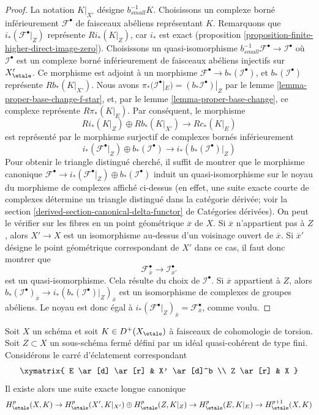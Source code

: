 \begin{proof}
La notation $K|_{X'}$ désigne $b_{small}^{-1}K$.
Choisissons un complexe borné inférieurement $\mathcal{F}^\bullet$
de faisceaux abéliens représentant $K$. Remarquons que
$i_*(\mathcal{F}^\bullet|_Z)$ représente $Ri_*(K|_Z)$,
car $i_*$ est exact
(proposition \ref{proposition-finite-higher-direct-image-zero}).
Choisissons un quasi-isomorphisme
$b_{small}^{-1}\mathcal{F}^\bullet \to \mathcal{I}^\bullet$
où $\mathcal{I}^\bullet$ est un complexe borné inférieurement de faisceaux
abéliens injectifs sur $X'_\etale$. Ce morphisme est adjoint à un morphisme
$\mathcal{F}^\bullet \to b_*(\mathcal{I}^\bullet)$, et
$b_*(\mathcal{I}^\bullet)$ représente $Rb_*(K|_{X'})$.
Nous avons $\pi_*(\mathcal{I}^\bullet|_E) = (b_*\mathcal{I}^\bullet)|_Z$
par le lemme \ref{lemma-proper-base-change-f-star}, et, par le
lemme \ref{lemma-proper-base-change}, ce complexe représente
$R\pi_*(K|_E)$. Par conséquent, le morphisme
$$
Ri_*(K|_Z) \oplus Rb_*(K|_{X'}) \to Rc_*(K|_E)
$$
est représenté par le morphisme surjectif de complexes bornés inférieurement
$$
i_*(\mathcal{F}^\bullet|_Z) \oplus
b_*(\mathcal{I}^\bullet)
\to
i_*\left(b_*(\mathcal{I}^\bullet)|_Z\right)
$$
Pour obtenir le triangle distingué cherché, il suffit de montrer que
le morphisme canonique
$\mathcal{F}^\bullet \to i_*(\mathcal{F}^\bullet|_Z) \oplus
b_*(\mathcal{I}^\bullet)$
induit un quasi-isomorphisme sur le noyau du morphisme de complexes
affiché ci-dessus (en effet, une suite exacte courte
de complexes détermine un triangle distingué dans la catégorie
dérivée; voir la
section \ref{derived-section-canonical-delta-functor} de Catégories dérivées).
On peut le vérifier sur les fibres en un point géométrique $\overline{x}$ de $X$.
Si $\overline{x}$ n'appartient pas à $Z$, alors $X' \to X$ est un isomorphisme
au-dessus d'un voisinage ouvert de $\overline{x}$. Si $\overline{x}'$
désigne le point géométrique correspondant de $X'$ dans ce cas, il
faut donc montrer que
$$
\mathcal{F}^\bullet_{\overline{x}} \to \mathcal{I}^\bullet_{\overline{x}'}
$$
est un quasi-isomorphisme. Cela résulte du choix de $\mathcal{I}^\bullet$.
Si $\overline{x}$ appartient à $Z$, alors
$b_*(\mathcal{I}^\bullet)_{\overline{x}} \to 
i_*\left(b_*(\mathcal{I}^\bullet)|_Z\right)_{\overline{x}}$
est un isomorphisme de complexes de groupes abéliens. Le
noyau est donc égal à
$i_*(\mathcal{F}^\bullet|_Z)_{\overline{x}} =
\mathcal{F}^\bullet_{\overline{x}}$, comme voulu.
\end{proof}

\begin{lemma}
\label{lemma-blow-up-square-etale-cohomology}
Soit $X$ un schéma et soit $K \in D^+(X_\etale)$ à
faisceaux de cohomologie de torsion. Soit $Z \subset X$ un sous-schéma fermé
défini par un idéal quasi-cohérent de type fini. Considérons le
carré d'éclatement correspondant
$$
\xymatrix{
E \ar[d] \ar[r] & X' \ar[d]^b \\
Z \ar[r] & X
}
$$
Il existe alors une suite exacte longue canonique
$$
H^p_\etale(X, K) \to
H^p_\etale(X', K|_{X'}) \oplus
H^p_\etale(Z, K|_Z) \to
H^p_\etale(E, K|_E) \to
H^{p + 1}_\etale(X, K)
$$
\end{lemma}

